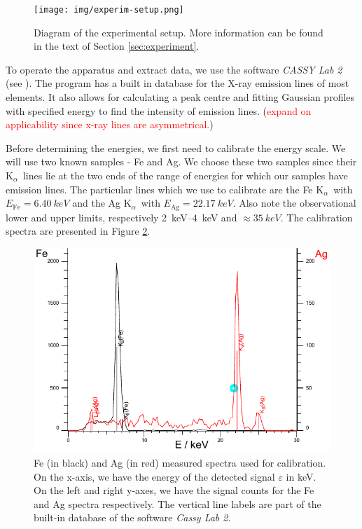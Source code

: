 \documentclass[11pt,a4paper,twoside,onecolumn]{article}
\newcommand{\reminder}[1]{\textcolor{red}{#1}}
\newcommand{\Kalpha}{$\mathrm{K}_\alpha$~}
\begin{document}
\begin{figure}[!htbp]
    \centering
    \texttt{[image: img/experim-setup.png]}
    \caption{Diagram of the experimental setup. More information can be found in the text of Section \ref{sec:experiment}.}\label{fig:experim-setup}
\end{figure}

To operate the apparatus and extract data, we use the software \emph{CASSY Lab 2} (see \cite{cassylab2}). The program has a built in database for the X-ray emission lines of most elements. It also allows for calculating a peak centre and fitting Gaussian profiles with specified energy to find the intensity of emission lines. (\reminder{expand on applicability since x-ray lines are asymmetrical.})

Before determining the energies, we first need to calibrate the energy scale. We will use two known samples - Fe and Ag. We choose these two samples since their \Kalpha lines lie at the two ends of the range of energies for which our samples have emission lines. The particular lines which we use to calibrate are the Fe \Kalpha with $E_\mathrm{Fe} = \qty{6.40}{keV}$ and the Ag \Kalpha with $E_\mathrm{Ag} = \qty{22.17}{keV}$. Also note the observational lower and upper limits, respectively \qtyrange{2}{4}{keV} and $\approx \qty{35}{keV}$. The calibration spectra are presented in Figure \ref{fig:calibration}.

\begin{figure}[!htbp]
    \centering
    \includegraphics[width=\textwidth]{img/calibration.pdf}
    \caption{Fe (in black) and Ag (in red) measured spectra used for calibration. On the x-axis, we have the energy of the detected signal $\varepsilon$ in \unit{keV}. On the left and right y-axes, we have the signal counts for the Fe and Ag spectra respectively. The vertical line labels are part of the built-in database of the software \emph{Cassy Lab 2}.}\label{fig:calibration}
\end{figure}
\end{document}

